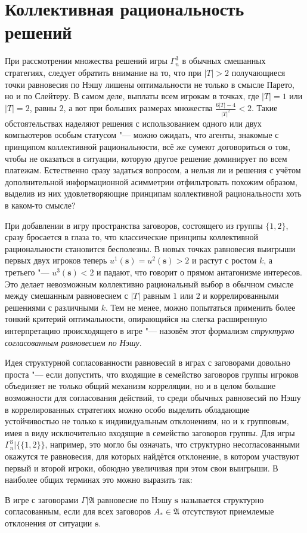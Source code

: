 \section{Коллективная рациональность решений}\label{sec:ch2/sec5}

При рассмотрении множества решений игры $\Gamma^3_n$ в обычных смешанных стратегиях, следует обратить внимание на то, что при $\left| T \right| > 2$ получающиеся точки равновесия по Нэшу лишены оптимальности не только в смысле Парето, но и по Слейтеру. В самом деле, выплаты всем игрокам в точках, где $\left| T \right| = 1$ или $\left| T \right| = 2$, равны $2$, а вот при больших размерах множества $\frac{6 \left| T \right| - 4}{\left| T \right|^2} < 2$. Такие обстоятельствах наделяют решения с использованием одного или двух компьютеров особым статусом "--- можно ожидать, что агенты, знакомые с принципом коллективной рациональности, всё же сумеют договориться о том, чтобы не оказаться в ситуации, которую другое решение доминирует по всем платежам. Естественно сразу задаться вопросом, а нельзя ли и решения с учётом дополнительной информационной асимметрии отфильтровать похожим образом, выделив из них удовлетворяющие принципам коллективной рациональности хоть в каком-то смысле?

При добавлении в игру пространства заговоров, состоящего из группы $\{1, 2\}$, сразу бросается в глаза то, что классические принципы коллективной рациональности становится бесполезны. В новых точках равновесия выигрыши первых двух игроков теперь $u^1(\mathbf{s}) = u^2(\mathbf{s}) > 2$ и растут с ростом $k$, а третьего "--- $u^3(\mathbf{s}) < 2$ и падают, что говорит о прямом антагонизме интересов. Это делает невозможным коллективно рациональный выбор в обычном смысле между смешанным равновесием с $\left| T \right|$ равным $1$ или $2$ и коррелированными решениями с различными $k$. Тем не менее, можно попытаться применить более тонкий критерий оптимальности, опирающийся на слегка расширенную интерпретацию происходящего в игре "--- назовём этот формализм \emph{структурно согласованным равновесием по Нэшу}.

Идея структурной согласованности равновесий в играх с заговорами довольно проста "--- если допустить, что входящие в семейство заговоров группы игроков объединяет не только общий механизм корреляции, но и в целом большие возможности для согласования действий, то среди обычных равновесий по Нэшу в коррелированных стратегиях можно особо выделить обладающие устойчивостью не только к индивидуальным отклонениям, но и к групповым, имея в виду исключительно входящие в семейство заговоров группы. Для игры $\Gamma^3_n | \{\{1,2\}\}$, например, это могло бы означать, что структурно несогласованными окажутся те равновесия, для которых найдётся отклонение, в котором участвуют первый и второй игроки, обоюдно увеличивая при этом свои выигрыши. В наиболее общих терминах это можно выразить так:
\begin{definition}
	В игре с заговорами $\Gamma | \mathfrak{A}$ равновесие по Нэшу $\mathbf{s}$ называется структурно согласованным, если для всех заговоров $A_* \in \mathfrak{A}$ отсутствуют приемлемые отклонения от ситуации $\mathbf{s}$.
\end{definition}

